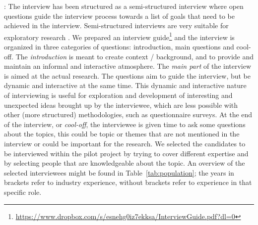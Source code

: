 : The interview has been structured as a semi-structured interview where open questions guide the interview process towards a list of goals that need to be achieved in the interview. Semi-structured interviews are very suitable for exploratory research \cite{Runeson:2009:GCR:1519313.1519324}. We prepared an interview guide\footnote{\url{https://www.dropbox.com/s/esnehg0iz7ekksa/InterviewGuide.pdf?dl=0}} and the interview is organized in three categories of questions: introduction, main questions and cool-off.
The {\em introduction} is meant to create context / background, and to provide and maintain an informal and interactive atmosphere. %
The {\em main part} of the interview is aimed at the actual research. The questions aim to guide the interview, but be dynamic and interactive at the same time. This dynamic and interactive nature of interviewing is useful for exploration and development of interesting and unexpected ideas brought up by the interviewee, which are less possible with other (more structured) methodologies, such as questionnaire surveys.
At the end of the interview, or {\em cool-off}, the interviewee is given time to ask some questions about the topics, this could be topic or themes that are not mentioned in the interview or could be important for the research. We selected the candidates to be interviewed within the pilot project by trying to cover different expertise and by selecting people that are knowledgeable about the topic.
An overview of the selected interviewees might be found in Table~\ref{tab:population}; the years in brackets refer to industry experience, without brackets refer to experience in that specific role.

